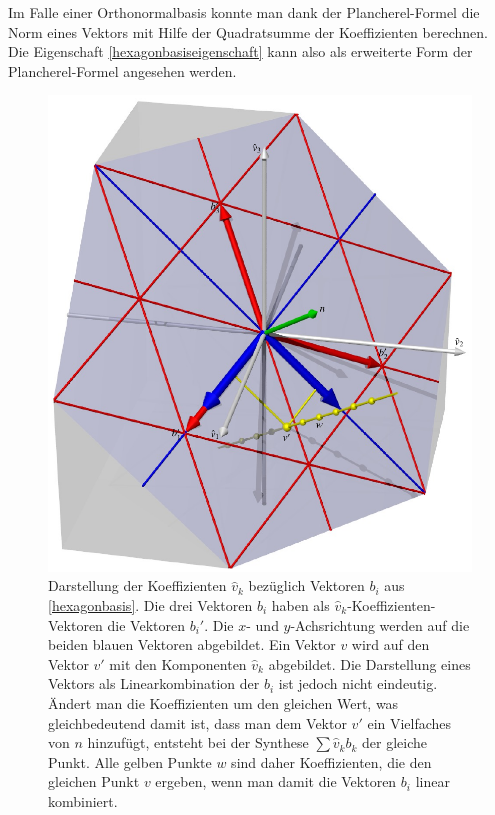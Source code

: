 Im Falle einer Orthonormalbasis konnte man dank der Plancherel-Formel
die Norm eines Vektors mit Hilfe der Quadratsumme der Koeffizienten
berechnen.
Die Eigenschaft \eqref{hexagonbasiseigenschaft} kann also als erweiterte
Form der Plancherel-Formel angesehen werden.

\begin{figure}
\centering
\includegraphics{chapters/1-geometrie/images/tri.pdf}
\caption{Darstellung der Koeffizienten $\hat{v}_k$ bezüglich Vektoren $b_i$
aus \eqref{hexagonbasis}.
Die drei Vektoren $b_i$ haben als $\hat{v}_k$-Koeffizienten-Vektoren
die Vektoren $b_i'$.
Die $x$- und $y$-Achsrichtung werden auf die beiden blauen Vektoren
abgebildet.
Ein Vektor $v$ wird auf den Vektor $v'$ mit den Komponenten
$\hat{v}_k$ abgebildet.
Die Darstellung eines Vektors als Linearkombination der $b_i$ ist
jedoch nicht eindeutig.
Ändert man die Koeffizienten um den gleichen Wert, was gleichbedeutend damit
ist, dass man dem Vektor $v'$ ein Vielfaches von $n$ hinzufügt, entsteht
bei der Synthese $\sum \hat{v}_k b_k$ der gleiche Punkt.
Alle gelben Punkte $w$ sind daher Koeffizienten, die den gleichen Punkt $v$
ergeben, wenn man damit die Vektoren $b_i$ linear kombiniert.
\label{3dbasisbild}}
\end{figure}

